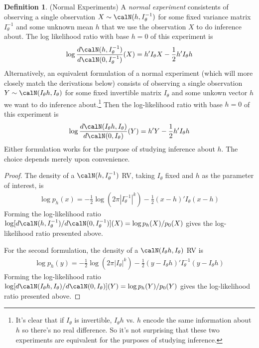 \documentclass[12pt]{article}
\theoremstyle{plain}
\theoremstyle{definition}
\newtheorem{defn}[thm]{Definition}
\theoremstyle{remark}
\begin{document}
\begin{defn}(Normal Experiments)
A \emph{normal experiment} consistents of observing a single observation
$X\sim \calN(h, I_\theta^{-1})$ for some fixed variance matrix
$I_\theta^{-1}$ and some unknown mean $h$ that we use the observation
$X$ to do inference about.
The log likelihood ratio with base $h=0$ of this experiment is
\begin{align}
  \log\frac{d\calN(h,I_{\theta}^{-1})}{d\calN(0,I_{\theta}^{-1})}(X)
  =
  h'I_\theta X
  -
  \frac{1}{2}
  h'I_{\theta}h
  \label{normalexp1}
\end{align}
Alternatively, an equivalent formulation of a normal experiment (which
will more closely match the derivations below) consists of observing a
single observation $Y\sim \calN(I_\theta h, I_\theta)$ for some fixed
invertible matrix $I_\theta$ and some unkown vector $h$ we want to do
inference about.\footnote{%
  It's clear that if $I_\theta$ is invertible, $I_\theta h$ vs. $h$
  encode the same information about $h$ so there's no real difference.
  So it's not surprising that these two experiments are equivalent for
  the purposes of studying inference.
}
Then the log-likelihood ratio with base $h=0$ of this experiment is
\begin{align}
  \log\frac{d\calN(I_\theta h,I_{\theta})}{d\calN(0,I_{\theta})}(Y)
  =
  h' Y
  -
  \frac{1}{2}
  h'I_{\theta}h
  \label{normalexp2}
\end{align}
Either formulation works for the purpose of studying inference about
$h$. The choice depends merely upon convenience.
\end{defn}
\begin{proof}
The density of a $\calN(h,I_{\theta}^{-1})$ RV, taking $I_\theta$ fixed
and $h$ as the parameter of interest, is
\begin{align*}
  \log p_h(x)
  =
  -\frac{1}{2}\log(2\pi|I_\theta^{-1}|^{k})
  -
  \frac{1}{2}
  (x-h)'I_{\theta}(x-h)
\end{align*}
Forming the log-likelihood ratio
$\log [d\calN(h,I_{\theta}^{-1})/d\calN(0,I_{\theta}^{-1})](X)=\log
p_h(X)/p_0(X)$ gives the log-likelihood ratio presented above.

For the second formulation, the density of a $\calN(I_\theta h,I_{\theta})$
RV is
\begin{align*}
  \log p_h(y)
  =
  -\frac{1}{2}\log(2\pi|I_\theta|^{k})
  -
  \frac{1}{2}
  (y-I_\theta h)'I_{\theta}^{-1}(y-I_\theta h)
\end{align*}
Forming the log-likelihood ratio
$\log [d\calN(I_\theta h,I_{\theta})/d\calN(0,I_{\theta})](Y)=\log
p_h(Y)/p_0(Y)$ gives the log-likelihood ratio presented above.
\end{proof}
\end{document}
